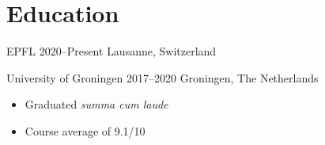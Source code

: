 \section*{Education}

{EPFL} %
{2020--Present} %
{Lausanne, Switzerland} %

{University of Groningen} %
{2017--2020} %
{Groningen, The Netherlands} %
{%
  \begin{itemize}
    \item Graduated \textit{summa cum laude}
    \item Course average of 9.1/10
  \end{itemize}
}
